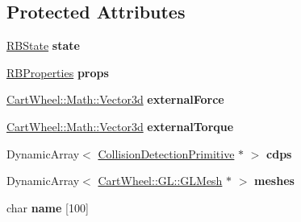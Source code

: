 \subsection*{Protected Attributes}
\begin{DoxyCompactItemize}
\item 
\hypertarget{classCartWheel_1_1Physics_1_1RigidBody_a1cc8d258ec471ea441a41426387d70d8}{
\hyperlink{classCartWheel_1_1Physics_1_1RBState}{RBState} {\bfseries state}}
\label{classCartWheel_1_1Physics_1_1RigidBody_a1cc8d258ec471ea441a41426387d70d8}

\item 
\hypertarget{classCartWheel_1_1Physics_1_1RigidBody_a1500ef8cad7dfaeb68865ccbfa7c5382}{
\hyperlink{classCartWheel_1_1Physics_1_1RBProperties}{RBProperties} {\bfseries props}}
\label{classCartWheel_1_1Physics_1_1RigidBody_a1500ef8cad7dfaeb68865ccbfa7c5382}

\item 
\hypertarget{classCartWheel_1_1Physics_1_1RigidBody_acba6dcc88baa63304bc6b664d3cf2a3a}{
\hyperlink{classCartWheel_1_1Math_1_1Vector3d}{CartWheel::Math::Vector3d} {\bfseries externalForce}}
\label{classCartWheel_1_1Physics_1_1RigidBody_acba6dcc88baa63304bc6b664d3cf2a3a}

\item 
\hypertarget{classCartWheel_1_1Physics_1_1RigidBody_a7ddef79ae922652e548343196a373515}{
\hyperlink{classCartWheel_1_1Math_1_1Vector3d}{CartWheel::Math::Vector3d} {\bfseries externalTorque}}
\label{classCartWheel_1_1Physics_1_1RigidBody_a7ddef79ae922652e548343196a373515}

\item 
\hypertarget{classCartWheel_1_1Physics_1_1RigidBody_aab892be04152f0e8aa1239c39fb844a3}{
DynamicArray$<$ \hyperlink{classCartWheel_1_1Physics_1_1CollisionDetectionPrimitive}{CollisionDetectionPrimitive} $\ast$ $>$ {\bfseries cdps}}
\label{classCartWheel_1_1Physics_1_1RigidBody_aab892be04152f0e8aa1239c39fb844a3}

\item 
\hypertarget{classCartWheel_1_1Physics_1_1RigidBody_ad097e9c978461f9abd95d5386d9f1707}{
DynamicArray$<$ \hyperlink{classCartWheel_1_1GL_1_1GLMesh}{CartWheel::GL::GLMesh} $\ast$ $>$ {\bfseries meshes}}
\label{classCartWheel_1_1Physics_1_1RigidBody_ad097e9c978461f9abd95d5386d9f1707}

\item 
\hypertarget{classCartWheel_1_1Physics_1_1RigidBody_a483f2060a83a04e87df8957022309b12}{
char {\bfseries name} \mbox{[}100\mbox{]}}
\label{classCartWheel_1_1Physics_1_1RigidBody_a483f2060a83a04e87df8957022309b12}


\end{DoxyCompactItemize}
